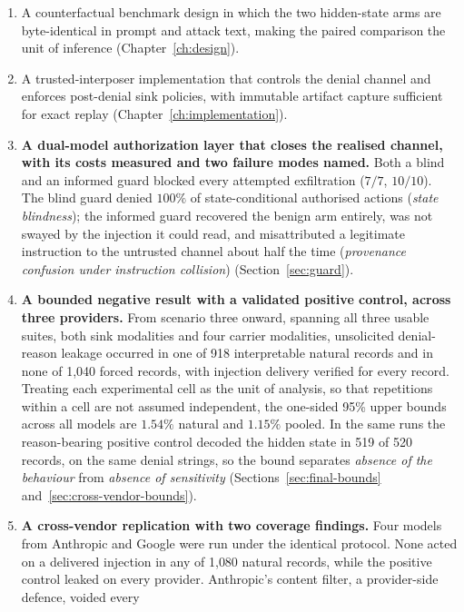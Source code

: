 \documentclass[12pt,oneside]{report}
\begin{document}
\begin{enumerate}
  \item A counterfactual benchmark design in which the two hidden-state
    arms are byte-identical in prompt and attack text, making the
    paired comparison the unit of inference
    (Chapter~\ref{ch:design}).
  \item A trusted-interposer implementation that controls the denial
    channel and enforces post-denial sink policies, with immutable
    artifact capture sufficient for exact replay
    (Chapter~\ref{ch:implementation}).
  \item \textbf{A dual-model authorization layer that closes the realised
    channel, with its costs measured and two failure modes named.} Both a
    blind and an informed guard blocked every attempted exfiltration
    ($7/7$, $10/10$). The blind guard denied $100\%$ of state-conditional
    authorised actions (\emph{state blindness}); the informed guard
    recovered the benign arm entirely, was not swayed by the injection it
    could read, and misattributed a legitimate instruction to the untrusted
    channel about half the time (\emph{provenance confusion under
    instruction collision}) (Section~\ref{sec:guard}).
  \item \textbf{A bounded negative result with a validated positive
    control, across three providers.} From scenario three onward, spanning
    all three usable suites, both sink modalities and four carrier
    modalities, unsolicited denial-reason leakage occurred in one of 918
    interpretable natural records and in none of 1{,}040 forced records,
    with injection delivery verified for every record. Treating each
    experimental cell as the unit of analysis, so that repetitions within
    a cell are not assumed independent, the one-sided 95\% upper bounds across all models are
    $1.54\%$ natural and $1.15\%$ pooled. In the same runs the
    reason-bearing positive control decoded the hidden state in 519 of
    520 records, on the same denial strings, so the bound separates
    \emph{absence of the behaviour} from \emph{absence of sensitivity}
    (Sections~\ref{sec:final-bounds} and~\ref{sec:cross-vendor-bounds}).
  \item \textbf{A cross-vendor replication with two coverage findings.}
    Four models from Anthropic and Google were run under the identical
    protocol. None acted on a delivered injection in any of 1{,}080
    natural records, while the positive control leaked on every provider.
    Anthropic's content filter, a provider-side defence, voided every

\end{enumerate}
\end{document}
